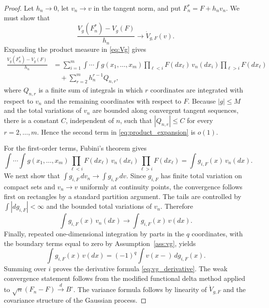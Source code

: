\documentclass[10pt,a4paper]{amsart}
\newcommand{\dto}{\xrightarrow{d}}
\begin{document}
\begin{proof}
Let \(h_n\to0\), let \(v_n\to v\) in the tangent norm, and put \(F_n^*=F+h_nv_n\).  We must show that
\[
\frac{V_g(F_n^*)-V_g(F)}{h_n}\to \dot V_{g,F}(v).
\]
Expanding the product measure in \eqref{eq:Vg} gives
\begin{align}\label{eq:product_expansion}
\frac{V_g(F_n^*)-V_g(F)}{h_n}
&=\sum_{i=1}^m
\int\cdots\int g(x_1,\ldots,x_m)
\prod_{\ell<i}F(dx_\ell)\,v_n(dx_i)\prod_{\ell>i}F(dx_\ell) \\
&\quad +\sum_{r=2}^m h_n^{r-1} Q_{n,r},\nonumber
\end{align}
where \(Q_{n,r}\) is a finite sum of integrals in which \(r\) coordinates are integrated with respect to \(v_n\) and the remaining coordinates with respect to \(F\).  Because \(|g|\le M\) and the total variations of \(v_n\) are bounded along convergent tangent sequences, there is a constant \(C\), independent of \(n\), such that \(|Q_{n,r}|\le C\) for every \(r=2,\ldots,m\).  Hence the second term in \eqref{eq:product_expansion} is \(o(1)\).

For the first-order terms, Fubini's theorem gives
\[
\int\cdots\int g(x_1,\ldots,x_m)
\prod_{\ell<i}F(dx_\ell)\,v_n(dx_i)\prod_{\ell>i}F(dx_\ell)
=\int g_{i,F}(x)\,v_n(dx).
\]
We next show that \(\int g_{i,F}\,dv_n\to \int g_{i,F}\,dv\).  Since \(g_{i,F}\) has finite total variation on compact sets and \(v_n\to v\) uniformly at continuity points, the convergence follows first on rectangles by a standard partition argument.  The tails are controlled by \(\int|dg_{i,F}|<\infty\) and the bounded total variations of \(v_n\).  Therefore
\[
\int g_{i,F}(x)\,v_n(dx)\to \int g_{i,F}(x)\,v(dx).
\]
Finally, repeated one-dimensional integration by parts in the \(q\) coordinates, with the boundary terms equal to zero by Assumption~\ref{ass:vg}, yields
\[
\int g_{i,F}(x)\,v(dx)=(-1)^q\int v(x-)\,dg_{i,F}(x).
\]
Summing over \(i\) proves the derivative formula \eqref{eq:vg_derivative}.  The weak convergence statement follows from the modified functional delta method applied to \(\sqrt n(F_n-F)\dto B^\circ\).  The variance formula follows by linearity of \(\dot V_{g,F}\) and the covariance structure of the Gaussian process.
\end{proof}
\end{document}
